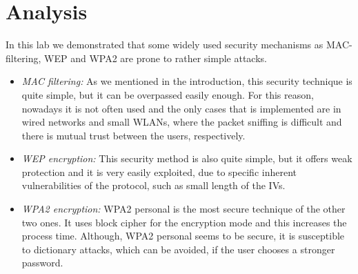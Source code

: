 \documentclass[12pt,a4paper]{article}
\begin{document}
	\section{Analysis}
	In this lab we demonstrated that some widely used security mechanisms as MAC-filtering, WEP and WPA2 are prone to rather simple attacks.
	\begin{itemize}
		\item \emph{MAC filtering:} As we mentioned in the introduction, this security technique is quite simple, but it can be overpassed easily enough. For this reason, nowadays it is not often used and the only cases that is implemented are in wired networks and small WLANs, where the packet sniffing is difficult and there is mutual trust between the users, respectively.
		
		\item \emph{WEP encryption:} This security method is also quite simple, but it offers weak protection and it is very easily exploited, due to specific inherent vulnerabilities of the protocol, such as small length of the IVs.
		
		\item \emph{WPA2 encryption:} WPA2 personal is the most secure technique of the other two ones. It uses block cipher for the encryption mode and this increases the process time. Although, WPA2 personal seems to be secure, it is susceptible to dictionary attacks, which can be avoided, if the user chooses a stronger password. 
		
		
	\end{itemize}
	
	
	
	
\end{document}
